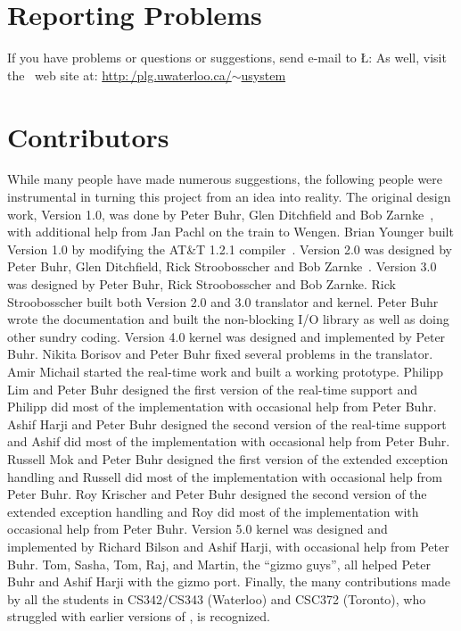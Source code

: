 \documentclass[openright,twoside]{report}
\begin{document}
\section{Reporting Problems}

If you have problems or questions or suggestions, send e-mail to \LGinlinetrue\LGbegin\lgrinde\L{}\endlgrinde\LGend{}:
As well, visit the \uS\ web site at: \href{http://plg.uwaterloo.ca/~usystem}{\textsf{http:\,/\hspace{0.1ex}plg.uwaterloo.ca/$\sim$usystem}}


\section{Contributors}

While many people have made numerous suggestions, the following people were instrumental in turning this project from an idea into reality.
The original design work, Version 1.0, was done by Peter Buhr, Glen Ditchfield and Bob Zarnke~\cite{Buhr89b}, with additional help from Jan Pachl on the train to Wengen.
Brian Younger built Version 1.0 by modifying the AT\&T 1.2.1 \CC compiler~\cite{Younger91}.
Version 2.0 was designed by Peter Buhr, Glen Ditchfield, Rick Stroobosscher and Bob Zarnke~\cite{Buhr92a}.
Version 3.0 was designed by Peter Buhr, Rick Stroobosscher and Bob Zarnke.
Rick Stroobosscher built both Version 2.0 and 3.0 translator and kernel.
Peter Buhr wrote the documentation and built the non-blocking I/O library as well as doing other sundry coding.
Version 4.0 kernel was designed and implemented by Peter Buhr.
Nikita Borisov and Peter Buhr fixed several problems in the translator.
Amir Michail started the real-time work and built a working prototype.
Philipp Lim and Peter Buhr designed the first version of the real-time support and Philipp did most of the implementation with occasional help from Peter Buhr.
Ashif Harji and Peter Buhr designed the second version of the real-time support and Ashif did most of the implementation with occasional help from Peter Buhr.
Russell Mok and Peter Buhr designed the first version of the extended exception handling and Russell did most of the implementation with occasional help from Peter Buhr.
Roy Krischer and Peter Buhr designed the second version of the extended exception handling and Roy did most of the implementation with occasional help from Peter Buhr.
Version 5.0 kernel was designed and implemented by Richard Bilson and Ashif Harji, with occasional help from Peter Buhr.
Tom, Sasha, Tom, Raj, and Martin, the ``gizmo guys'', all helped Peter Buhr and Ashif Harji with the gizmo port.
Finally, the many contributions made by all the students in CS342/CS343 (Waterloo) and CSC372 (Toronto), who struggled with earlier versions of \uC, is recognized.
\end{document}
